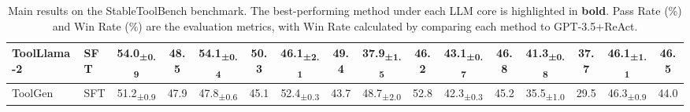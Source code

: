 \documentclass{article}
\begin{document}
\begin{table}[t]
\begin{adjustbox}{width=0.98\textwidth}
\begin{tabular}{@{}ll|cc|cc|cc|cc|cc|cc|cc@{}}
 \midrule
 \multirow{1}{*}{ToolLlama-2} & SFT & 54.0\textsubscript{±0.9} & 48.5 & 54.1\textsubscript{±0.4} & 50.3 & 46.1\textsubscript{±2.1} & 49.4 & 37.9\textsubscript{±1.5} & 46.2 & 43.1\textsubscript{±0.7} & 46.8 & 41.3\textsubscript{±0.8} & 37.7 & 46.1\textsubscript{±1.1} & 46.5 \\
 \midrule
  \multirow{1}{*}{ToolGen} & SFT & 51.2\textsubscript{±0.9} & 47.9 & 47.8\textsubscript{±0.6} & 45.1 & 52.4\textsubscript{±0.3} & 43.7 & 48.7\textsubscript{±2.0} & 52.8 & 42.3\textsubscript{±0.3} & 45.2 & 35.5\textsubscript{±1.0} & 29.5 & 46.3\textsubscript{±0.9} & 44.0 \\
\bottomrule
\end{tabular}
\end{adjustbox}
\caption{Main results on the StableToolBench benchmark. The best-performing method under each LLM core is highlighted in \textbf{bold}. Pass Rate (\%) and Win Rate (\%) are the evaluation metrics, with Win Rate calculated by comparing each method to GPT-3.5+ReAct.}
\label{tab:stable-tool-bench}
\end{table}

\begin{table}[t]
\centering
\small
\footnotesize
\setlength{\tabcolsep}{2pt}
\caption{Evaluation results on TravelPlanner benchmark. MIRROR consistently outperforms ReAct across different LLM cores.}
\label{tab:travel-planner}
\end{table}
\end{document}
